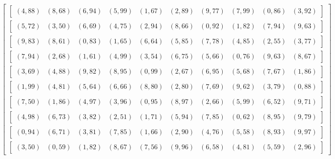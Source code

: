 \documentclass[11pt, a4paper]{article}
\begin{document}
\[
\begin{bmatrix}
\begin{bmatrix}(4, 88) & (8, 68) & (6, 94) & (5, 99) & (1, 67) & (2, 89) & (9, 77) & (7, 99) & (0, 86) & (3, 92)\end{bmatrix} \\
\begin{bmatrix}(5, 72) & (3, 50) & (6, 69) & (4, 75) & (2, 94) & (8, 66) & (0, 92) & (1, 82) & (7, 94) & (9, 63)\end{bmatrix} \\
\begin{bmatrix}(9, 83) & (8, 61) & (0, 83) & (1, 65) & (6, 64) & (5, 85) & (7, 78) & (4, 85) & (2, 55) & (3, 77)\end{bmatrix} \\
\begin{bmatrix}(7, 94) & (2, 68) & (1, 61) & (4, 99) & (3, 54) & (6, 75) & (5, 66) & (0, 76) & (9, 63) & (8, 67)\end{bmatrix} \\
\begin{bmatrix}(3, 69) & (4, 88) & (9, 82) & (8, 95) & (0, 99) & (2, 67) & (6, 95) & (5, 68) & (7, 67) & (1, 86)\end{bmatrix} \\
\begin{bmatrix}(1, 99) & (4, 81) & (5, 64) & (6, 66) & (8, 80) & (2, 80) & (7, 69) & (9, 62) & (3, 79) & (0, 88)\end{bmatrix} \\
\begin{bmatrix}(7, 50) & (1, 86) & (4, 97) & (3, 96) & (0, 95) & (8, 97) & (2, 66) & (5, 99) & (6, 52) & (9, 71)\end{bmatrix} \\
\begin{bmatrix}(4, 98) & (6, 73) & (3, 82) & (2, 51) & (1, 71) & (5, 94) & (7, 85) & (0, 62) & (8, 95) & (9, 79)\end{bmatrix} \\
\begin{bmatrix}(0, 94) & (6, 71) & (3, 81) & (7, 85) & (1, 66) & (2, 90) & (4, 76) & (5, 58) & (8, 93) & (9, 97)\end{bmatrix} \\
\begin{bmatrix}(3, 50) & (0, 59) & (1, 82) & (8, 67) & (7, 56) & (9, 96) & (6, 58) & (4, 81) & (5, 59) & (2, 96)\end{bmatrix}
\end{bmatrix}
\]
\end{document}
